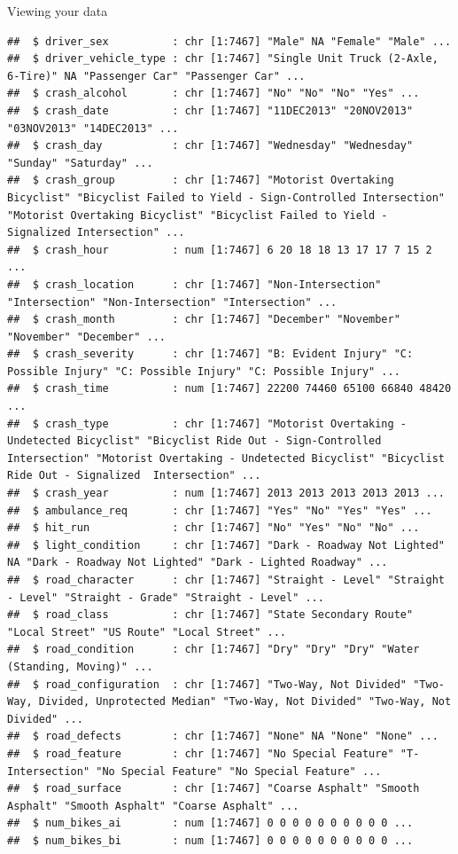 \documentclass[
  ignorenonframetext,
]{beamer}
\begin{document}
\begin{frame}[fragile]{Viewing your data}
\begin{verbatim}
##  $ driver_sex          : chr [1:7467] "Male" NA "Female" "Male" ...
##  $ driver_vehicle_type : chr [1:7467] "Single Unit Truck (2-Axle, 6-Tire)" NA "Passenger Car" "Passenger Car" ...
##  $ crash_alcohol       : chr [1:7467] "No" "No" "No" "Yes" ...
##  $ crash_date          : chr [1:7467] "11DEC2013" "20NOV2013" "03NOV2013" "14DEC2013" ...
##  $ crash_day           : chr [1:7467] "Wednesday" "Wednesday" "Sunday" "Saturday" ...
##  $ crash_group         : chr [1:7467] "Motorist Overtaking Bicyclist" "Bicyclist Failed to Yield - Sign-Controlled Intersection" "Motorist Overtaking Bicyclist" "Bicyclist Failed to Yield - Signalized Intersection" ...
##  $ crash_hour          : num [1:7467] 6 20 18 18 13 17 17 7 15 2 ...
##  $ crash_location      : chr [1:7467] "Non-Intersection" "Intersection" "Non-Intersection" "Intersection" ...
##  $ crash_month         : chr [1:7467] "December" "November" "November" "December" ...
##  $ crash_severity      : chr [1:7467] "B: Evident Injury" "C: Possible Injury" "C: Possible Injury" "C: Possible Injury" ...
##  $ crash_time          : num [1:7467] 22200 74460 65100 66840 48420 ...
##  $ crash_type          : chr [1:7467] "Motorist Overtaking - Undetected Bicyclist" "Bicyclist Ride Out - Sign-Controlled Intersection" "Motorist Overtaking - Undetected Bicyclist" "Bicyclist Ride Out - Signalized  Intersection" ...
##  $ crash_year          : num [1:7467] 2013 2013 2013 2013 2013 ...
##  $ ambulance_req       : chr [1:7467] "Yes" "No" "Yes" "Yes" ...
##  $ hit_run             : chr [1:7467] "No" "Yes" "No" "No" ...
##  $ light_condition     : chr [1:7467] "Dark - Roadway Not Lighted" NA "Dark - Roadway Not Lighted" "Dark - Lighted Roadway" ...
##  $ road_character      : chr [1:7467] "Straight - Level" "Straight - Level" "Straight - Grade" "Straight - Level" ...
##  $ road_class          : chr [1:7467] "State Secondary Route" "Local Street" "US Route" "Local Street" ...
##  $ road_condition      : chr [1:7467] "Dry" "Dry" "Dry" "Water (Standing, Moving)" ...
##  $ road_configuration  : chr [1:7467] "Two-Way, Not Divided" "Two-Way, Divided, Unprotected Median" "Two-Way, Not Divided" "Two-Way, Not Divided" ...
##  $ road_defects        : chr [1:7467] "None" NA "None" "None" ...
##  $ road_feature        : chr [1:7467] "No Special Feature" "T-Intersection" "No Special Feature" "No Special Feature" ...
##  $ road_surface        : chr [1:7467] "Coarse Asphalt" "Smooth Asphalt" "Smooth Asphalt" "Coarse Asphalt" ...
##  $ num_bikes_ai        : num [1:7467] 0 0 0 0 0 0 0 0 0 0 ...
##  $ num_bikes_bi        : num [1:7467] 0 0 0 0 0 0 0 0 0 0 ...

\end{verbatim}
\end{frame}
\end{document}

